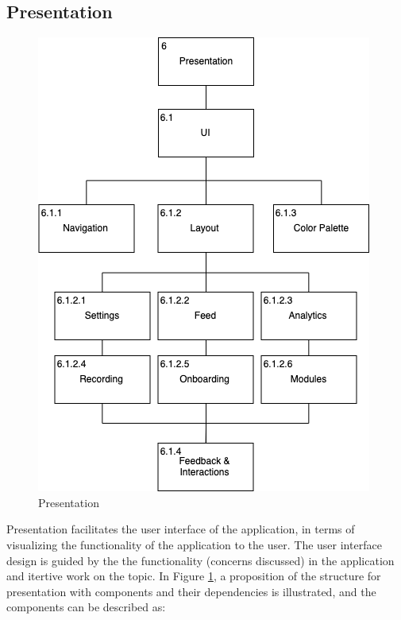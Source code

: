 \subsection{Presentation}\label{soc:presentation}
\begin{figure}
    \centering
    \includegraphics[scale=0.5]{images/Presentation.png}
    \caption{Presentation}
    \label{fig:hta_presentation}
\end{figure}

Presentation facilitates the user interface of the application, in terms of visualizing the functionality of the application to the user. The user interface design is guided by the the functionality (concerns discussed) in the application and itertive work on the topic. In Figure \ref{fig:hta_presentation}, a proposition of the structure for presentation with components and their dependencies is illustrated, and the components can be described as:

